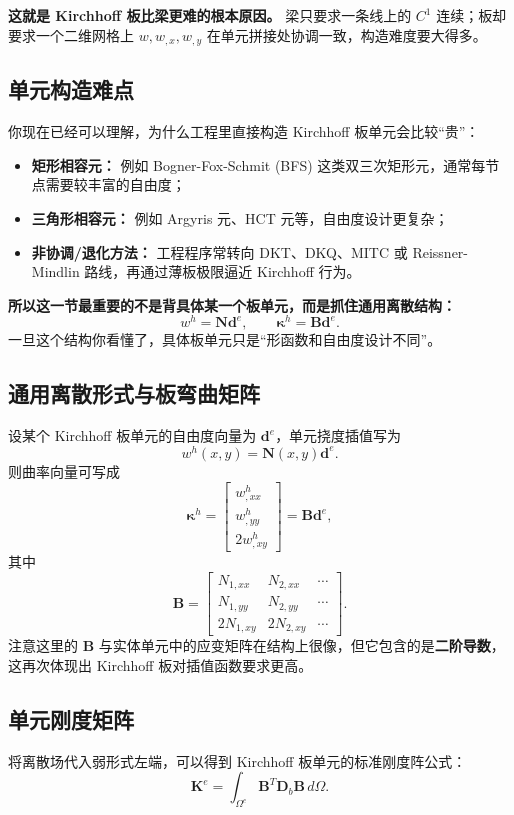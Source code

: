 \documentclass[11pt, a4paper, UTF8]{ctexart}
\begin{document}
\textbf{这就是 Kirchhoff 板比梁更难的根本原因。}
梁只要求一条线上的 $C^1$ 连续；板却要求一个二维网格上 $w,w_{,x},w_{,y}$ 在单元拼接处协调一致，构造难度要大得多。

\subsection{单元构造难点}
你现在已经可以理解，为什么工程里直接构造 Kirchhoff 板单元会比较“贵”：
\begin{itemize}
    \item \textbf{矩形相容元：} 例如 Bogner-Fox-Schmit (BFS) 这类双三次矩形元，通常每节点需要较丰富的自由度；
    \item \textbf{三角形相容元：} 例如 Argyris 元、HCT 元等，自由度设计更复杂；
    \item \textbf{非协调/退化方法：} 工程程序常转向 DKT、DKQ、MITC 或 Reissner-Mindlin 路线，再通过薄板极限逼近 Kirchhoff 行为。
\end{itemize}

\textbf{所以这一节最重要的不是背具体某一个板单元，而是抓住通用离散结构：}
\[
w^h = \bm{N}\bm{d}^e,
\qquad
\bm{\kappa}^h = \bm{B}\bm{d}^e.
\]
一旦这个结构你看懂了，具体板单元只是“形函数和自由度设计不同”。

\subsection{通用离散形式与板弯曲矩阵}
设某个 Kirchhoff 板单元的自由度向量为 $\bm{d}^e$，单元挠度插值写为
\[
w^h(x,y)=\bm{N}(x,y)\bm{d}^e.
\]
则曲率向量可写成
\[
\bm{\kappa}^h =
\begin{bmatrix}
w^h_{,xx} \\
w^h_{,yy} \\
2w^h_{,xy}
\end{bmatrix}
=
\bm{B}\bm{d}^e,
\]
其中
\[
\bm{B}
=
\begin{bmatrix}
N_{1,xx} & N_{2,xx} & \cdots \\
N_{1,yy} & N_{2,yy} & \cdots \\
2N_{1,xy} & 2N_{2,xy} & \cdots
\end{bmatrix}.
\]
注意这里的 $\bm{B}$ 与实体单元中的应变矩阵在结构上很像，但它包含的是\textbf{二阶导数}，这再次体现出 Kirchhoff 板对插值函数要求更高。

\subsection{单元刚度矩阵}
将离散场代入弱形式左端，可以得到 Kirchhoff 板单元的标准刚度阵公式：
\[
\bm{K}^e
=
\int_{\Omega^e}
\bm{B}^T \bm{D}_b \bm{B}
\,
d\Omega.
\]
\end{document}
